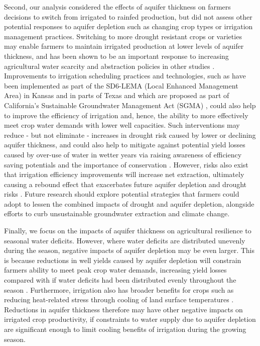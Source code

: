\documentclass[
]{article}
\begin{document}
Second, our analysis considered the effects of aquifer thickness on farmers decisions to switch from irrigated to rainfed production, but did not assess other potential responses to aquifer depletion such as changing crop types or irrigation management practices. Switching to more drought resistant crops or varieties may enable farmers to maintain irrigated production at lower levels of aquifer thickness, and has been shown to be an important response to increasing agricultural water scarcity and abstraction policies in other studies \citep{bhattarai2021impact, deines2019quantifying, manning2017producer}. Improvements to irrigation scheduling practices and technologies, such as have been implemented as part of the SD6-LEMA (Local Enhanced Management Area) in Kansas \citep{deines2019quantifying, glose2022quantifying} and in parts of Texas \citep{mrad2020peak} and which are proposed as part of California's Sustainable Groundwater Management Act (SGMA) \citep{berbel2019droughts, lubell2020sustainable}, could also help to improve the efficiency of irrigation and, hence, the ability to more effectively meet crop water demands with lower well capacities. Such interventions may reduce - but not eliminate - increases in drought risk caused by lower or declining aquifer thickness, and could also help to mitigate against potential yield losses caused by over-use of water in wetter years via raising awareness of efficiency saving potentials \citep{foster2019assessing} and the importance of conservation \citep{marston2022}. However, risks also exist that irrigation efficiency improvements will increase net extraction, ultimately causing a rebound effect that exacerbates future aquifer depletion and drought risks \citep{grafton2018paradox,perez2021agricultural}. Future research should explore potential strategies that farmers could adopt to lessen the combined impacts of drought and aquifer depletion, alongside efforts to curb unsustainable groundwater extraction and climate change.

Finally, we focus on the impacts of aquifer thickness on agricultural resilience to seasonal water deficits. However, where water deficits are distributed unevenly during the season, negative impacts of aquifer depletion may be even larger. This is because reductions in well yields caused by aquifer depletion will constrain farmers ability to meet peak crop water demands, increasing yield losses compared with if water deficits had been distributed evenly throughout the season \citep{ortiz2019unpacking}. Furthermore, irrigation also has broader benefits for crops such as reducing heat-related stress through cooling of land surface temperatures \citep{adegoke2003impact, bonfils2007empirical, lobell2008effect, zhu2022untangling}. Reductions in aquifer thickness therefore may have other negative impacts on irrigated crop productivity, if constraints to water supply due to aquifer depletion are significant enough to limit cooling benefits of irrigation during the growing season.
\end{document}
